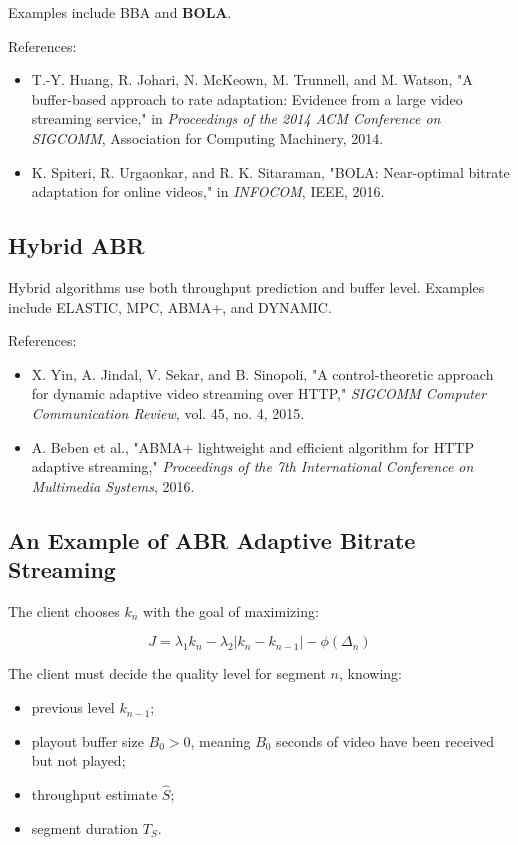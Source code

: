 Examples include BBA and \textbf{BOLA}.

References:

\begin{itemize}
\item T.-Y. Huang, R. Johari, N. McKeown, M. Trunnell, and M. Watson, "A buffer-based approach to rate adaptation: Evidence from a large video streaming service," in \textit{Proceedings of the 2014 ACM Conference on SIGCOMM}, Association for Computing Machinery, 2014.
\item K. Spiteri, R. Urgaonkar, and R. K. Sitaraman, "BOLA: Near-optimal bitrate adaptation for online videos," in \textit{INFOCOM}, IEEE, 2016.
\end{itemize}

\subsection{Hybrid ABR}

Hybrid algorithms use both throughput prediction and buffer level. Examples include ELASTIC, MPC, ABMA+, and DYNAMIC.

References:

\begin{itemize}
\item X. Yin, A. Jindal, V. Sekar, and B. Sinopoli, "A control-theoretic approach for dynamic adaptive video streaming over HTTP," \textit{SIGCOMM Computer Communication Review}, vol. 45, no. 4, 2015.
\item A. Beben et al., "ABMA+ lightweight and efficient algorithm for HTTP adaptive streaming," \textit{Proceedings of the 7th International Conference on Multimedia Systems}, 2016.
\end{itemize}

\subsection{An Example of ABR Adaptive Bitrate Streaming}

The client chooses $k_n$ with the goal of maximizing:

\[
J = \lambda_1 k_n - \lambda_2 |k_n - k_{n-1}| - \phi(\Delta_n)
\]

The client must decide the quality level for segment $n$, knowing:

\begin{itemize}
\item previous level $k_{n-1}$;
\item playout buffer size $B_0 > 0$, meaning $B_0$ seconds of video have been received but not played;
\item throughput estimate $\hat{S}$;
\item segment duration $T_S$.
\end{itemize}


